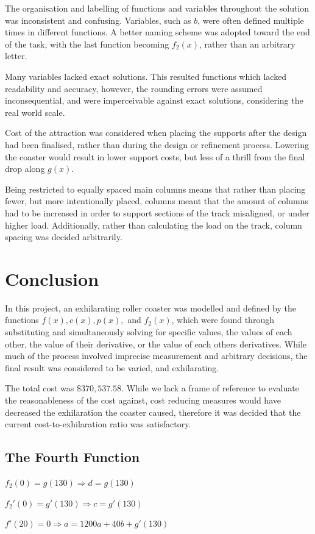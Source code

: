 \documentclass[10pt, letterpaper]{article}
\begin{document}
The organisation and labelling of functions and variables throughout the solution was inconsistent and confusing. Variables, such as $b$, were often defined multiple times in different functions. A better naming scheme was adopted toward the end of the task, with the last function becoming $f_2(x)$, rather than an arbitrary letter. 

Many variables lacked exact solutions. This resulted functions which lacked readability and accuracy, however, the rounding errors were assumed inconsequential, and were imperceivable against exact solutions, considering the real world scale.

Cost of the attraction was considered when placing the supports after the design had been finalised, rather than during the design or refinement process. Lowering the coaster would result in lower support costs, but less of a thrill from the final drop along $g(x)$. 

Being restricted to equally spaced main columns means that rather than placing fewer, but more intentionally placed, columns meant that the amount of columns had to be increased in order to support sections of the track misaligned, or under higher load. Additionally, rather than calculating the load on the track, column spacing was decided arbitrarily.
\section{Conclusion}
In this project, an exhilarating roller coaster was modelled and defined by the functions $f(x), c(x), p(x),$ and $f_2(x)$, which were found through substituting and simultaneously solving for specific values, the values of each other, the value of their derivative, or the value of each others derivatives. While much of the process involved imprecise measurement and arbitrary decisions, the final result was considered to be varied, and exhilarating. 

The total cost was $\$370,537.58$. While we lack a frame of reference to evaluate the reasonableness of the cost against, cost reducing measures would have decreased the exhilaration the coaster caused, therefore it was decided that the current cost-to-exhilaration ratio was satisfactory.



\begin{appendices}

	\section{The Fourth Function}
	$f_2(0)=g(130)\Rightarrow d=g(130)$
	
	$f_2'(0) = g'(130)\Rightarrow c=g'(130)$
	
	$f'(20)=0\Rightarrow a=1200a+40b+g'(130)$
	
	
\end{appendices}
\end{document}
